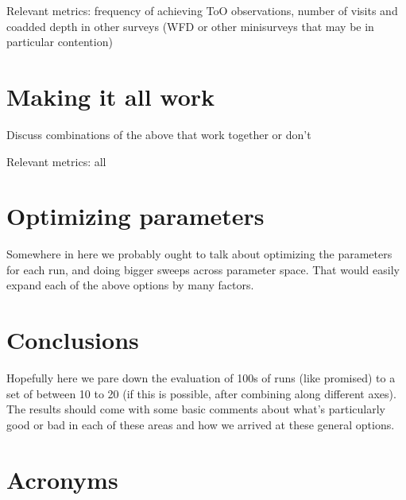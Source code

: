 Relevant metrics: frequency of achieving ToO observations, number of visits and coadded depth in other surveys (WFD or other minisurveys that may be in particular contention)

\section{Making it all work}
Discuss combinations of the above that work together or don't 

Relevant metrics: all

\section{Optimizing parameters}
Somewhere in here we probably ought to talk about optimizing the parameters for each run, and doing bigger sweeps across parameter space. That would easily expand each of the above options by many factors.

\section{Conclusions}
Hopefully here we pare down the evaluation of 100s of runs (like promised) to a set of between 10 to 20 (if this is possible, after combining along different axes). 
The results should come with some basic comments about what's particularly good or bad in each of these areas and how we arrived at these general options. 




\section{Acronyms} \label{sec:acronyms}

